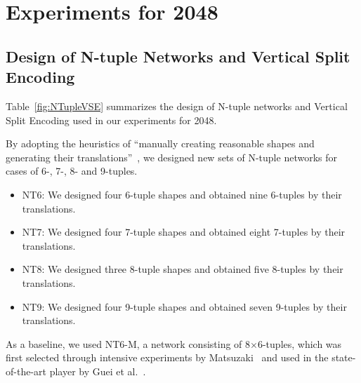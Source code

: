 \section{Experiments for 2048}

\subsection{Design of N-tuple Networks and Vertical Split Encoding}


Table~\ref{fig:NTupleVSE} summarizes the design of N-tuple networks and Vertical Split Encoding
used in our experiments for 2048.

By adopting the heuristics of ``manually creating reasonable shapes and generating their translations''~\cite{Jask18}, we designed new sets of N-tuple networks for cases of 6-, 7-, 8- and 9-tuples.
\begin{itemize}
\item \textsf{NT6}: We designed four 6-tuple shapes and obtained nine 6-tuples by their translations.
\item \textsf{NT7}: We designed four 7-tuple shapes and obtained eight 7-tuples by their translations.
\item \textsf{NT8}: We designed three 8-tuple shapes and obtained five 8-tuples by their translations.
\item \textsf{NT9}: We designed four 9-tuple shapes and obtained seven 9-tuples by their translations.
\end{itemize}
As a baseline, we used \textsf{NT6-M}, a network consisting of 8$\times$6-tuples, which was first selected through intensive experiments by Matsuzaki~\cite{Mats16} and used in the state-of-the-art player by Guei et al.~\cite{GuCW22}.

